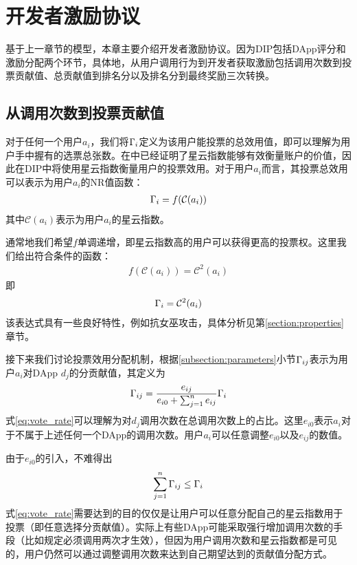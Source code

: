 \section{开发者激励协议}
基于上一章节的模型，本章主要介绍开发者激励协议。因为DIP包括DApp评分和激励分配两个环节，具体地，从用户调用行为到开发者获取激励包括调用次数到投票贡献值、总贡献值到排名分以及排名分到最终奖励三次转换。

\subsection{从调用次数到投票贡献值}
对于任何一个用户$a_i$，我们将$\Gamma_i$定义为该用户能投票的总效用值，即可以理解为用户手中握有的选票总张数。在\cite{Nabulasyellowpaper}中已经证明了星云指数能够有效衡量账户的价值，因此在DIP中将使用星云指数衡量用户的投票效用。对于用户$a_i$而言，其投票总效用可以表示为用户$a_i$的NR值函数：
\begin{align}
\Gamma_i = f(\mathcal{C}(a_i))
\end{align}
其中$\mathcal{C}(a_i)$表示为用户$a_i$的星云指数。

通常地我们希望$f$单调递增，即星云指数高的用户可以获得更高的投票权。这里我们给出符合条件的函数：
\begin{align}
f(\mathcal{C}(a_i))=\mathcal{C}^2(a_i)
\end{align}
即
\begin{align}
\Gamma_i = \mathcal{C}^2(a_i)
\end{align}
该表达式具有一些良好特性，例如抗女巫攻击，具体分析见第\ref{section:properties}章节。

接下来我们讨论投票效用分配机制，根据\ref{subsection:parameters}小节$\Gamma_{ij}$表示为用户$a_i$对DApp $d_j$的分贡献值，其定义为
\begin{align}
\label{eq:vote_rate}
\Gamma_{ij} = \frac{e_{ij}}{e_{i0}+\sum_{j=1}^n {e_{ij}}} \Gamma_i
\end{align}
式\ref{eq:vote_rate}可以理解为对$d_j$调用次数在总调用次数上的占比。这里$e_{i0}$表示$a_i$对于不属于上述任何一个DApp的调用次数。用户$a_i$可以任意调整$e_{i0}$以及$e_{ij}$的数值。

由于$e_{i0}$的引入，不难得出
$$\sum_{j=1}^n \Gamma_{ij} \leq \Gamma_i$$
\noindent 式\ref{eq:vote_rate}需要达到的目的仅仅是让用户可以任意分配自己的星云指数用于投票（即任意选择分贡献值）。实际上有些DApp可能采取强行增加调用次数的手段（比如规定必须调用两次才生效），但因为用户调用次数和星云指数都是可见的，用户仍然可以通过调整调用次数来达到自己期望达到的贡献值分配方式。

